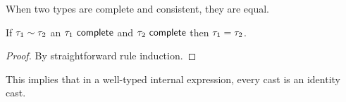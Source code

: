 When two types are complete and consistent, they are equal.

\begin{lem} If $\tau_1 \sim \tau_2$ an $\tau_1~\mathsf{complete}$ and $\tau_2~\mathsf{complete}$ then $\tau_1 = \tau_2$. 
\end{lem}
\begin{proof} By straightforward rule induction. \end{proof}

This implies that in a well-typed internal expression, every cast is an identity cast.
